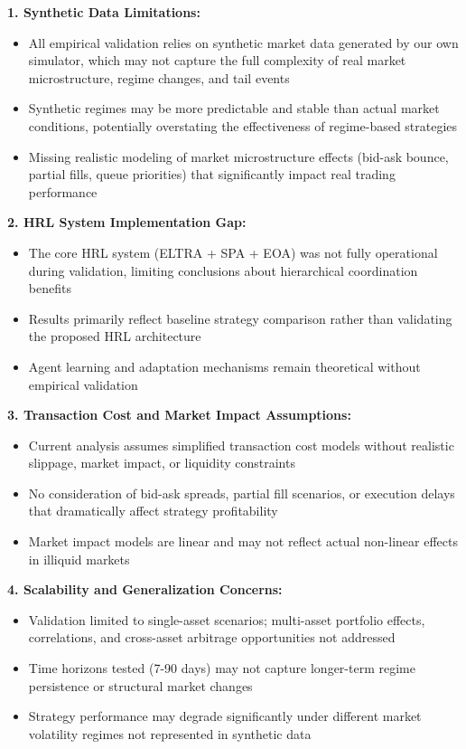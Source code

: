\documentclass[11pt,a4paper]{article}
\begin{document}
\textbf{1. Synthetic Data Limitations:}
\begin{itemize}
\item All empirical validation relies on synthetic market data generated by our own simulator, which may not capture the full complexity of real market microstructure, regime changes, and tail events
\item Synthetic regimes may be more predictable and stable than actual market conditions, potentially overstating the effectiveness of regime-based strategies
\item Missing realistic modeling of market microstructure effects (bid-ask bounce, partial fills, queue priorities) that significantly impact real trading performance

\end{itemize}
\textbf{2. HRL System Implementation Gap:}
\begin{itemize}
\item The core HRL system (ELTRA + SPA + EOA) was not fully operational during validation, limiting conclusions about hierarchical coordination benefits
\item Results primarily reflect baseline strategy comparison rather than validating the proposed HRL architecture
\item Agent learning and adaptation mechanisms remain theoretical without empirical validation

\end{itemize}
\textbf{3. Transaction Cost and Market Impact Assumptions:}
\begin{itemize}
\item Current analysis assumes simplified transaction cost models without realistic slippage, market impact, or liquidity constraints
\item No consideration of bid-ask spreads, partial fill scenarios, or execution delays that dramatically affect strategy profitability
\item Market impact models are linear and may not reflect actual non-linear effects in illiquid markets

\end{itemize}
\textbf{4. Scalability and Generalization Concerns:}
\begin{itemize}
\item Validation limited to single-asset scenarios; multi-asset portfolio effects, correlations, and cross-asset arbitrage opportunities not addressed
\item Time horizons tested (7-90 days) may not capture longer-term regime persistence or structural market changes
\item Strategy performance may degrade significantly under different market volatility regimes not represented in synthetic data

\end{itemize}
\end{document}
